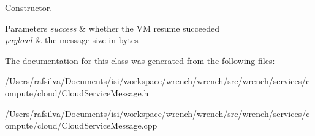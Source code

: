Constructor. 


\begin{DoxyParams}{Parameters}
{\em success} & whether the VM resume succeeded \\
\hline
{\em payload} & the message size in bytes \\
\hline
\end{DoxyParams}


The documentation for this class was generated from the following files\+:\begin{DoxyCompactItemize}
\item 
/\+Users/rafsilva/\+Documents/isi/workspace/wrench/wrench/src/wrench/services/compute/cloud/Cloud\+Service\+Message.\+h\item 
/\+Users/rafsilva/\+Documents/isi/workspace/wrench/wrench/src/wrench/services/compute/cloud/Cloud\+Service\+Message.\+cpp\end{DoxyCompactItemize}
